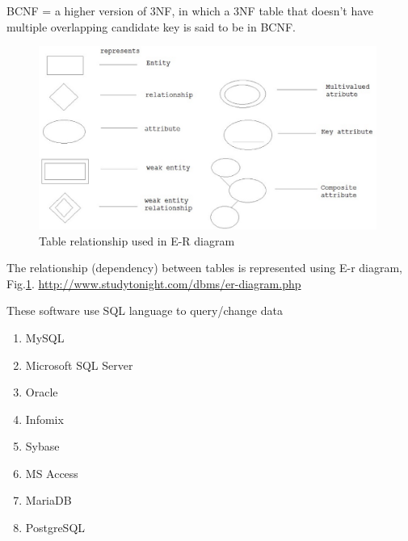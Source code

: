 BCNF = a higher version of 3NF, in which a 3NF table that doesn't have multiple
overlapping candidate key is said to be in BCNF.

\begin{figure}[hbt]
  \centerline{\includegraphics[height=6cm,
    angle=0]{./images/table-relationship.eps}}
\caption{Table relationship used in E-R diagram}
\label{fig:table-relationship}
\end{figure}

The relationship (dependency) between tables is represented using E-r diagram,
Fig.\ref{fig:table-relationship}.
\url{http://www.studytonight.com/dbms/er-diagram.php}


These software use SQL language to query/change data
\begin{enumerate}
  \item MySQL
  \item Microsoft SQL Server
  \item Oracle
  \item Infomix
  \item Sybase
  \item MS Access
  \item MariaDB
  \item PostgreSQL
\end{enumerate}

